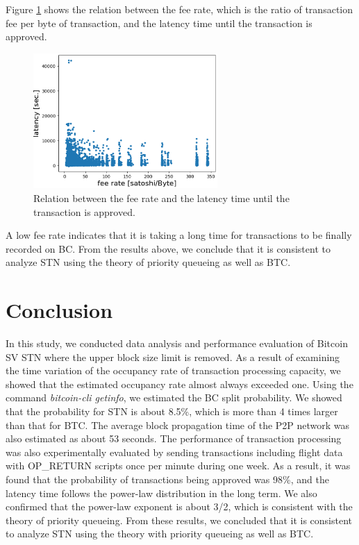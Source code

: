 \documentclass[graybox]{svmult}
\begin{document}
Figure \ref{fig:exp3-3} shows the relation between the fee rate, which is the ratio of transaction fee per byte of transaction, and the latency time until the transaction is approved. 
%
\begin{figure}[t]
  \begin{center}
    \includegraphics[width=70mm]{exp3-3.eps}
  \end{center}
  \caption{Relation between the fee rate and the latency time until the transaction is approved.}
  \label{fig:exp3-3}
\end{figure}
%
A low fee rate indicates that it is taking a long time for transactions to be finally recorded on BC.
From the results above, we conclude that it is consistent to analyze STN using the theory of priority queueing as well as BTC. 



\section{Conclusion}
\label{sec:conclusion}

In this study, we conducted data analysis and performance evaluation of Bitcoin SV STN where the upper block size limit is removed. 
As a result of examining the time variation of the occupancy rate of transaction processing capacity, we showed that the estimated occupancy rate almost always exceeded one. 
Using the command \textit{bitcoin-cli getinfo}, we estimated the BC split probability. 
We showed that the probability for STN is about 8.5\%, which is more than 4 times larger than that for BTC.
The average block propagation time of the P2P network was also estimated as about 53 seconds.
The performance of transaction processing was also experimentally evaluated by sending transactions including flight data with OP\_RETURN scripts once per minute during one week.
As a result, it was found that the probability of transactions being approved was 98\%, and the latency time follows the power-law distribution in the long term. 
We also confirmed that the power-law exponent is about 3/2, which is consistent with the theory of priority queueing.
From these results, we concluded that it is consistent to analyze STN using the theory with priority queueing as well as BTC. 
\end{document}
